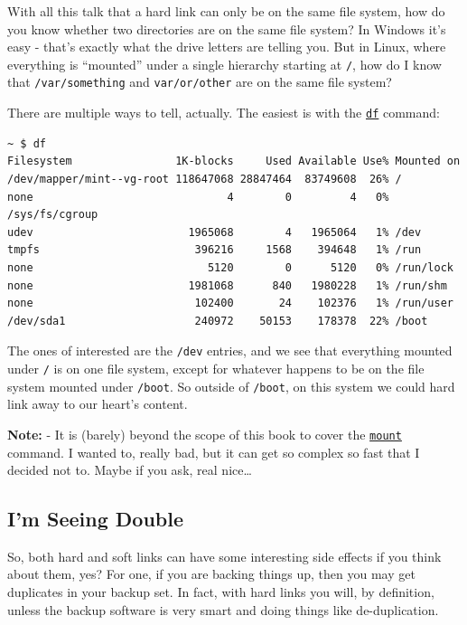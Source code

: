 \documentclass[10pt,]{book}
\numberwithin{figure}{chapter}
\begin{document}
With all this talk that a hard link can only be on the same file system,
how do you know whether two directories are on the same file system? In
Windows it's easy - that's exactly what the drive letters are telling
you. But in Linux, where everything is ``mounted'' under a single
hierarchy starting at \texttt{/}, how do I know that
\texttt{/var/something} and \texttt{var/or/other} are on the same file
system?

There are multiple ways to tell, actually. The easiest is with the
\href{http://linux.die.net/man/1/df}{\texttt{df}} command:

\begin{verbatim}
~ $ df
Filesystem                1K-blocks     Used Available Use% Mounted on
/dev/mapper/mint--vg-root 118647068 28847464  83749608  26% /
none                              4        0         4   0% /sys/fs/cgroup
udev                        1965068        4   1965064   1% /dev
tmpfs                        396216     1568    394648   1% /run
none                           5120        0      5120   0% /run/lock
none                        1981068      840   1980228   1% /run/shm
none                         102400       24    102376   1% /run/user
/dev/sda1                    240972    50153    178378  22% /boot
\end{verbatim}

The ones of interested are the \texttt{/dev} entries, and we see that
everything mounted under \texttt{/} is on one file system, except for
whatever happens to be on the file system mounted under \texttt{/boot}.
So outside of \texttt{/boot}, on this system we could hard link away to
our heart's content.

\textbf{Note:} - It is (barely) beyond the scope of this book to cover
the \href{http://linux.die.net/man/8/mount}{\texttt{mount}} command. I
wanted to, really bad, but it can get so complex so fast that I decided
not to. Maybe if you ask, real nice\ldots{}

\subsection{I'm Seeing Double}\label{im-seeing-double}

So, both hard and soft links can have some interesting side effects if
you think about them, yes? For one, if you are backing things up, then
you may get duplicates in your backup set. In fact, with hard links you
will, by definition, unless the backup software is very smart and doing
things like de-duplication.
\end{document}
